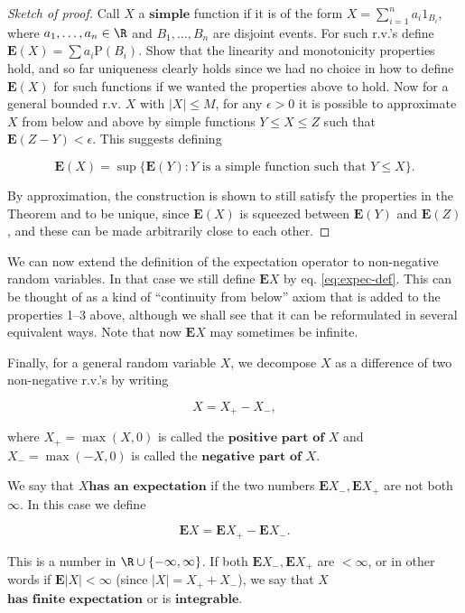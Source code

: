 \begin{proof}[Sketch of proof]
Call $X$ a $\textbf{simple}$ function if it is of the
form $X=\sum_{i=1}^n a_i 1_{B_i}$, where
$a_1,\ldots,a_n\in \R$ and $B_1,\ldots,B_n$ are
disjoint events. For such r.v.'s define
$\mathbf{E}(X)=\sum a_i \mathrm{P}(B_i)$. Show that
the linearity and monotonicity properties hold, and so
far uniqueness clearly holds since we had no choice in
how to define $\mathbf{E}(X)$ for such functions if
we wanted the properties above to hold. Now for a
general bounded r.v. $X$ with $|X|\le M$, for any
$\epsilon>0$ it is possible to approximate $X$ from
below and above by simple functions $Y \le X \le Z$
such that $\mathbf{E}(Z-Y) < \epsilon$. This suggests
defining

\begin{equation*} \tag{5}\label{eq:expec-def}
\mathbf{E}(X) = \sup \{ \mathbf{E}(Y) : Y\textrm{ is a simple function such that }Y \le X \}.
\end{equation*}

\noindent By approximation, the construction is shown to still
satisfy the properties in the Theorem and to be
unique, since $\mathbf{E}(X)$ is squeezed between
$\mathbf{E}(Y)$ and $\mathbf{E}(Z)$, and these can be
made arbitrarily close to each other.
\end{proof}

\noindent We can now extend the definition of the expectation
operator to non-negative random variables. In that
case we still define $\mathbf{E} X$ by eq.
\eqref{eq:expec-def}. This can be thought of as a kind of
``continuity from below'' axiom that is added to the
properties 1--3 above, although we shall see that it
can be reformulated in several equivalent ways. Note
that now $\mathbf{E} X$ may sometimes be infinite.

Finally, for a general random variable $X$, we
decompose $X$ as a difference of two non-negative
r.v.'s by writing

\[
X = X_+ - X_-,
\]

\noindent where $X_+ = \max(X,0)$ is called the
$\textbf{positive part of } X$ and $X_-=\max(-X,0)$
is called the $\textbf{negative part of } X$.

We say that $X$$\textbf{has an expectation}$ if the
two numbers $\mathbf{E} X_-, \mathbf{E} X_+$ are not
both $\infty$. In this case we define

\[
\mathbf{E} X = \mathbf{E} X_+ - \mathbf{E} X_-.
\]

\noindent This is a number in $\R\cup\{ -\infty,\infty\}$. If
both $\mathbf{E} X_-, \mathbf{E} X_+$ are $<\infty$,
or in other words if $\mathbf{E} |X|<\infty$ (since
$|X|=X_+ + X_-$), we say that $X$$\textbf{has finite expectation}$ or is
$\textbf{integrable}$.

